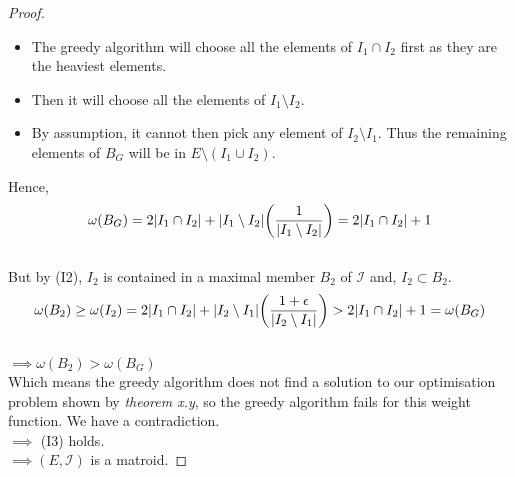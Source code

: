 \documentclass[../main.tex]{subfiles}
\begin{document}
\begin{proof}
\begin{itemize}
\item The greedy algorithm will choose all the elements of $I_1 \cap I_2$ first as they are the heaviest elements.
\item Then it will choose all the elements of $I_1 \setminus I_2.$
\item By assumption, it cannot then pick any element of $I_2 \setminus I_1.$ Thus the remaining elements of $B_G$ will be in $E \setminus (I_1 \cup I_2).$\\
\end{itemize}
Hence,\[
\omega(B_G) = 2|I_1 \cap I_2| + |I_1 \setminus I_2| \bigg( \frac{1}{|I_1 \setminus I_2|} \bigg) \\
= 2|I_1 \cap I_2| + 1
\]\\
But by (I2), $I_2$ is contained in a maximal member $B_2$ of $\mathcal{I}$ and, $I_2 \subset B_2.$\\
\[
\omega(B_2) \geq \omega(I_2) = 2|I_1 \cap I_2| + |I_2 \setminus I_1| \bigg(\frac{1+\epsilon}{|I_2 \setminus I_1|} \bigg)\\
> 2|I_1 \cap I_2| + 1 = \omega(B_G)
\]\\
$\implies \omega(B_2) > \omega(B_G)$\\
Which means the greedy algorithm does not find a solution to our optimisation problem shown by \textit{theorem x.y}, so the greedy algorithm fails for this weight function. We have a contradiction.\\
$\implies$ (I3) holds.\\
$\implies (E,\mathcal{I})$ is a matroid.
\end{proof}
\end{document}
